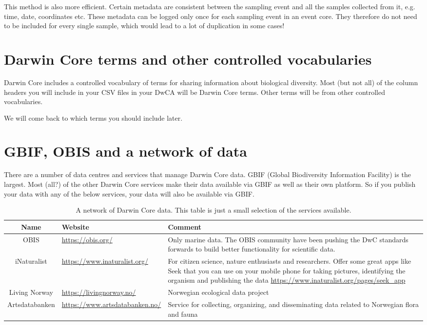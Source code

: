 \documentclass[a4paper,english, 11pt]{article}
\begin{document}
This method is also more efficient. Certain metadata are consistent between the sampling event and all the samples collected from it, e.g. time, date, coordinates etc. These metadata can be logged only once for each sampling event in an event core. They therefore do not need to be included for every single sample, which would lead to a lot of duplication in some cases!

\section{Darwin Core terms and other controlled vocabularies}
\label{s:dwcterms}

Darwin Core includes a controlled vocabulary of terms for sharing information about biological diversity. Most (but not all) of the column headers you will include in your CSV files in your DwCA will be Darwin Core terms. Other terms will be from other controlled vocabularies.

We will come back to which terms you should include later.

\section{GBIF, OBIS and a network of data}
\label{s:gbif}

There are a number of data centres and services that manage Darwin Core data. GBIF (Global Biodiversity Information Facility) is the largest. Most (all?) of the other Darwin Core services make their data available via GBIF as well as their own platform. So if you publish your data with any of the below services, your data will also be available via GBIF.

\begin{table}[h!]
\centering
\caption{A network of Darwin Core data. This table is just a small selection of the services available.}
\begin{tabular}{cp{6cm}p{6.5cm}}
\toprule
Name & Website       & Comment  \\
\midrule
OBIS       & \url{https://obis.org/} & Only marine data. The OBIS community have been pushing the DwC standards forwards to build better functionality for scientific data.      \\
iNaturalist       & \url{https://www.inaturalist.org/} & For citizen science, nature enthusiasts and researchers. Offer some great apps like Seek that you can use on your mobile phone for taking pictures, identifying the organism and publishing the data \url{https://www.inaturalist.org/pages/seek_app}     \\
Living Norway     & \url{https://livingnorway.no/} & Norwegian ecological data project     \\
Artsdatabanken  & \url{https://www.artsdatabanken.no/} &  Service for collecting, organizing, and disseminating data related to Norwegian flora and fauna \\
\bottomrule
\end{tabular}
\end{table} 
\end{document}
